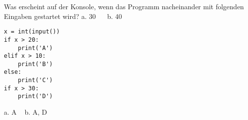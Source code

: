 \question[2] Was erscheint auf der Konsole, wenn das Programm nacheinander mit folgenden
Eingaben gestartet wird?
a. 30   ~~  b. 40
\begin{lstlisting}
x = int(input())
if x > 20:
    print('A')
elif x > 10:
    print('B')
else:
    print('C')
if x > 30:
    print('D')
\end{lstlisting}
\begin{solutionbox}{1cm}
a. A   ~ b. A, D
\end{solutionbox}

